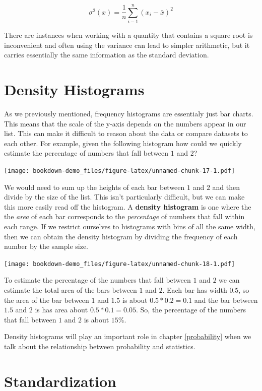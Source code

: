 \documentclass[]{book}
\begin{document}
\[\sigma^2(x) = \frac{1}{n}\sum_{i-1}^n (x_i - \bar{x})^2\]

There are instances when working with a quantity that contains a square root is inconvenient and often using the variance can lead to simpler arithmetic, but it carries essentially the same information as the standard deviation.

\hypertarget{density-histograms}{%
\section{Density Histograms}\label{density-histograms}}

As we previously mentioned, frequency histograms are essentialy just bar charts. This means that the scale of the y-axis depends on the numbers appear in our list. This can make it difficult to reason about the data or compare datasets to each other. For example, given the following histogram how could we quickly estimate the percentage of numbers that fall between \(1\) and \(2\)?

\texttt{[image: bookdown-demo\_files/figure-latex/unnamed-chunk-17-1.pdf]}

We would need to sum up the heights of each bar between \(1\) and \(2\) and then divide by the size of the list. This isn't particularly difficult, but we can make this more easily read off the histogram. A \textbf{density histogram} is one where the the \emph{area} of each bar corresponds to the \emph{percentage} of numbers that fall within each range. If we restrict ourselves to histograms with bins of all the same width, then we can obtain the density histogram by dividing the frequency of each number by the sample size.

\texttt{[image: bookdown-demo\_files/figure-latex/unnamed-chunk-18-1.pdf]}

To estimate the percentage of the numbers that fall between \(1\) and \(2\) we can estimate the total area of the bars between \(1\) and \(2\). Each bar has width \(0.5\), so the area of the bar between \(1\) and \(1.5\) is about \(0.5 * 0.2 = 0.1\) and the bar between \(1.5\) and \(2\) is has area about \(0.5 * 0.1 = 0.05\). So, the percentage of the numbers that fall between \(1\) and \(2\) is about \(15\%\).

Density histograms will play an important role in chapter \ref{probability} when we talk about the relationship between probability and statistics.

\hypertarget{standardization}{%
\section{Standardization}\label{standardization}}
\end{document}
